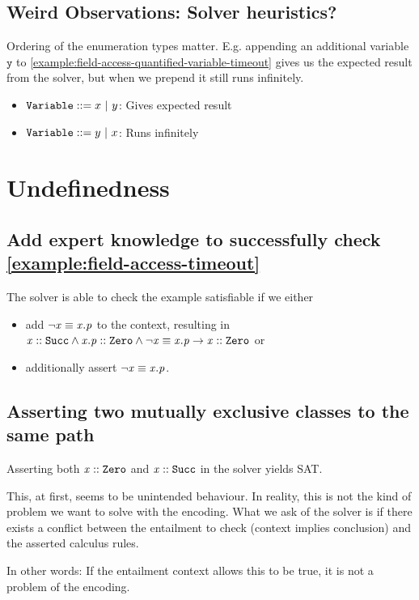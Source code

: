 \documentclass[a4paper]{article}
\begin{document}
\subsection{Weird Observations: Solver heuristics?}
Ordering of the enumeration types matter. E.g. appending an additional variable $\mathtt{y}$ to  \ref{example:field-access-quantified-variable-timeout} gives us the expected result from the solver,
but when we prepend it still runs infinitely.
\begin{itemize}
  \item $\mathtt{Variable} ::= x~|~y$: Gives expected result
  \item $\mathtt{Variable} ::= y~|~x$: Runs infinitely
\end{itemize}

\section{Undefinedness}
\subsection{Add expert knowledge to successfully check \ref{example:field-access-timeout}}
The solver is able to check the example satisfiable if we either
\begin{itemize}
  \item add $\neg \mathit{x} \equiv \mathit{x.p}$ to the context, resulting in ${\mathit{x} :: \mathit{\mathtt{Succ}} \land \mathit{x.p} :: \mathit{\mathtt{Zero}} \land \neg \mathit{x} \equiv \mathit{x.p}} \rightarrow {\ensuremath{\mathit{x} :: \mathit{\mathtt{Zero}}}}$ or
  \item additionally assert $\neg \mathit{x} \equiv \mathit{x.p}$.
\end{itemize}

\subsection{Asserting two mutually exclusive classes to the same path}
\label{section:mutually-exclusive-classes}
Asserting both $\mathit{x} :: \mathit{\mathtt{Zero}}$ and $\mathit{x} :: \mathit{\mathtt{Succ}}$ in the solver yields SAT.

This, at first, seems to be unintended behaviour.
In reality, this is not the kind of problem we want to solve with the encoding.
What we ask of the solver is if there exists a conflict between
the entailment to check (context implies conclusion)
and the asserted calculus rules.

In other words: If the entailment context allows this to be true,
it is not a problem of the encoding.
\end{document}
